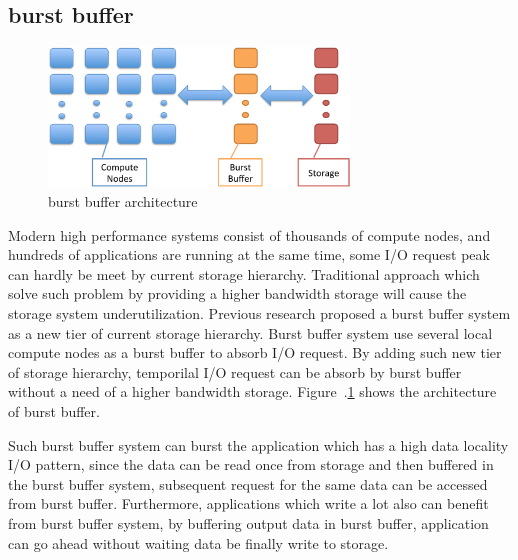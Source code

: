 \subsection{burst buffer}
\begin{figure}
\centering
\includegraphics[width=8cm]{img/burst_buffer.pdf}
\caption{burst buffer architecture}
\label{background:burst buffer architecture}
\end{figure}

Modern high performance systems consist of thousands of compute nodes, and hundreds of
applications are running at the same time, some I/O request peak can hardly be meet by current
storage hierarchy. 
Traditional approach which solve such problem by providing a higher bandwidth storage will cause
the storage system underutilization.
Previous research\cite{on_the_role_of_burst_buffers} proposed a
burst buffer system as a new tier of current storage hierarchy.
Burst buffer system use several local compute nodes as a burst buffer to absorb I/O
request. 
By adding such new tier of storage hierarchy, temporilal I/O request can be absorb by burst buffer
without a need of a higher bandwidth storage. Figure~.\ref{background:burst buffer architecture}
shows the architecture of burst buffer.

Such burst buffer system can burst the application which has a high data locality I/O pattern, since
the data can be read once from storage and then buffered in the burst buffer system, subsequent
request for the same data can be accessed from burst buffer.
Furthermore, applications which write a lot also can benefit from burst buffer system, by buffering
output data in burst buffer, application can go ahead without waiting data be finally write to
storage.

